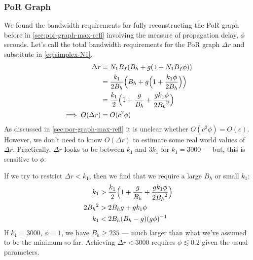 
\subsubsection{PoR Graph}

We found the bandwidth requirements for fully reconstructing the PoR graph before in \autoref{sec:por-graph-max-refl} involving the measure of propagation delay, $\phi$ seconds.
Let's call the total bandwidth requirements for the PoR graph $\Delta r$ and substitute in \autoref{eq:simplex-N1}.
\begin{align}{}
    \Delta r &= N_1 B_f (B_h + g(1 + N_1 B_f \phi)) \nonumber \\
    &= \frac{k_1}{2 B_h} \Bigl(B_h + g\Bigl(1 + \frac{k_1 \phi}{2 B_h}\Bigr)\Bigr) \nonumber \\
    &= \frac{k_1}{2}\Bigl(1 + \frac{g}{B_h} + \frac{g {k_1} \phi}{2 {B_h}^2}\Bigr) \label{eq:por-graph-delta-r} \\
    \implies O(\Delta r) &= O(c^2\phi) \nonumber
\end{align}
As discussed in \autoref{sec:por-graph-max-refl} it is unclear whether $O(c^2\phi) = O(c)$.
However, we don't need to know $O(\Delta r)$ to estimate some real world values of $\Delta r$.
Practically, $\Delta r$ looks to be between $k_1$ and $3 k_1$ for $k_1=3000$ --- but, this is sensitive to $\phi$.

If we try to restrict $\Delta r < k_1$, then we find that we require a large $B_h$ or small $k_1$:
\begin{align*}
    k_1 &> \frac{k_1}{2}\Bigl(1 + \frac{g}{B_h} + \frac{g {k_1} \phi}{2 {B_h}^2}\Bigr) \\
    2 {B_h}^2 &> 2 B_h g + g k_1 \phi \\
    k_1 &< 2 B_h (B_h - g) (g \phi)^{-1}
\end{align*}
If $k_1 = 3000$, $\phi = 1$, we have $B_h \ge 235$ --- much larger than what we've assumed to be the minimum so far.
Achieving $\Delta r < 3000$ requires $\phi \lesssim 0.2$ given the usual parameters.

